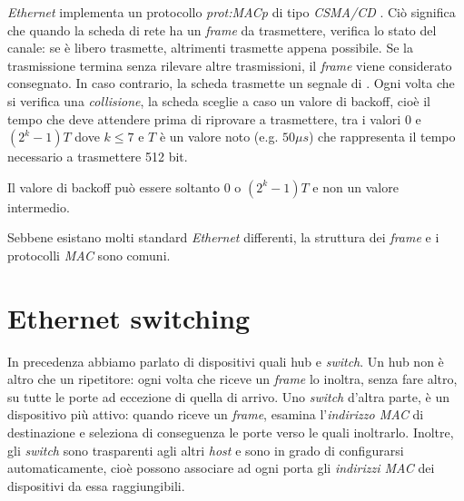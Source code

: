 \emph{Ethernet} implementa un protocollo \emph{\gls{prot:MACp}} di tipo
\emph{CSMA/CD }. Ciò significa che quando la scheda di rete
ha un \emph{frame} da trasmettere, verifica lo stato del canale: se è libero
trasmette, altrimenti trasmette appena possibile. Se la trasmissione termina
senza rilevare altre trasmissioni, il \emph{frame} viene considerato consegnato.
In caso contrario, la scheda trasmette un segnale di .
Ogni volta che si verifica una \emph{collisione}, la scheda sceglie a caso un
valore di backoff, cioè il tempo che deve attendere prima di riprovare a trasmettere,
tra i valori 0 e $(2^k-1)T$ dove $k\leq7$ e $T$ è un valore noto (e.g. $50\mu s$)
che rappresenta il tempo necessario a trasmettere 512 bit.

\begin{note}
    Il valore di backoff può essere soltanto 0 o $(2^k-1)T$ e non un
    valore intermedio.
\end{note}
\begin{note}
    Sebbene esistano molti standard \emph{Ethernet} differenti, la struttura dei
    \emph{frame} e i protocolli \emph{MAC} sono comuni.
\end{note}

\section{Ethernet switching}
In precedenza abbiamo parlato di dispositivi quali hub e \emph{switch}. Un hub
non è altro che un ripetitore: ogni volta che riceve un \emph{frame} lo inoltra,
senza fare altro, su tutte le porte ad eccezione di quella di arrivo. Uno
\emph{switch} d'altra parte, è un dispositivo più attivo: quando riceve un
\emph{frame}, esamina l'\emph{indirizzo MAC} di destinazione e seleziona di
conseguenza le porte verso le quali inoltrarlo. Inoltre, gli \emph{switch}
sono trasparenti agli altri \emph{host} e sono in grado di configurarsi
automaticamente, cioè possono associare ad ogni porta gli \emph{indirizzi MAC}
dei dispositivi da essa raggiungibili.

